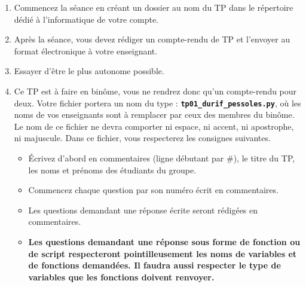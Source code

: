 \begin{enumerate}
\item Commencez la séance en créant un dossier au nom du TP dans le répertoire dédié à l'informatique de votre compte. 
\item Après la séance, vous devez rédiger un compte-rendu de TP et l'envoyer au format électronique à votre enseignant.
\item Essayer d'être le plus autonome possible. 
\item Ce TP est à faire en binôme, vous ne rendrez donc qu'un  compte-rendu pour deux.
Votre fichier portera un nom du type : \textbf{\texttt{tp01\_durif\_pessoles.py}}, où les noms de vos enseignants sont à remplacer par ceux des membres du binôme. Le nom de ce 
fichier ne devra comporter ni espace, ni accent, ni apostrophe, ni majuscule.
Dans ce fichier, vous respecterez les consignes suivantes.
\begin{itemize}
  \item \'Ecrivez d'abord en commentaires (ligne débutant par \#), le titre du TP, les noms et prénoms des étudiants du groupe.
  \item Commencez chaque question par son numéro écrit en commentaires.
  \item Les questions demandant une réponse écrite seront rédigées en commentaires.
  \item \textbf{Les questions demandant une réponse sous forme de fonction ou de script respecteront pointilleusement les noms de variables et de fonctions demandées. Il faudra aussi respecter le type de variables que les fonctions doivent renvoyer.}
\end{itemize}
\end{enumerate}


